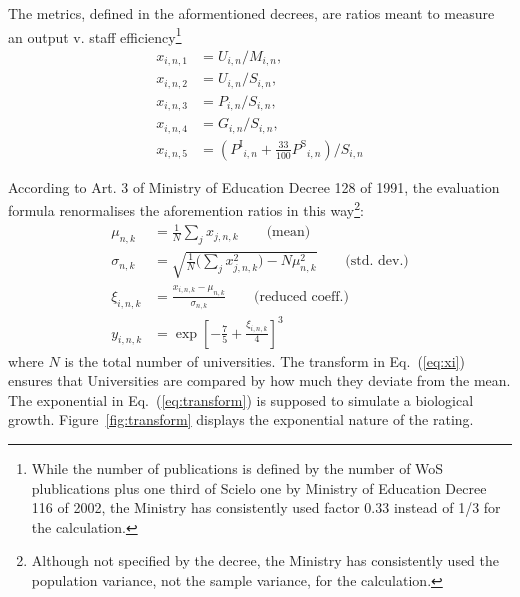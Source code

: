\documentclass[twocolumn]{article}
\def\npup{\ensuremath{U}}
\def\nmaj{\ensuremath{M}}
\def\nprof{\ensuremath{S}}
\def\ngrad{\ensuremath{P}}
\def\ngrant{\ensuremath{G}}
\def\nisi{\ensuremath{P^\text{I}}}
\def\nscielo{\ensuremath{P^\text{S}}}
\def\eqref#1{Eq.~(\ref{eq:#1})}
\begin{document}
The metrics, defined in the aformentioned decrees, are ratios meant to measure an output v. staff efficiency\footnote{While the number of publications is defined by the number of WoS plublications plus one third of Scielo one by Ministry of Education Decree 116 of 2002, the Ministry has consistently used factor 0.33 instead of 1/3 for the calculation.}
\begin{subequations}
\begin{align}
    x_{i,n,1} &= \npup_{i,n} / \nmaj_{i,n},  \label{eq:x1}                          \\
    x_{i,n,2} &= \npup_{i,n} / \nprof_{i,n},                           \\ 
    x_{i,n,3} &= \ngrad_{i,n} / \nprof_{i,n},                          \\
    x_{i,n,4} &= \ngrant_{i,n} / \nprof_{i,n},                         \\
    x_{i,n,5} &= (\nisi_{i,n} + \frac{33}{100} \nscielo_{i,n}) / \nprof_{i,n}
\end{align}
\end{subequations}

According to Art. 3 of Ministry of Education Decree 128 of 1991,  the
evaluation formula renormalises the aforemention ratios in this
way\footnote{Although not specified by the decree, the Ministry has
consistently used the population variance, not the sample variance, for the calculation.}:
\begin{subequations}
\begin{align}
    \mu_{n,k}    &= \frac1N\sum_j x_{j,n,k}\qquad\text{(mean)} \label{eq:mu}\\
    \sigma_{n,k} &= \sqrt{\frac 1N \Big(\sum_j x_{j,n,k}^2\Big) - N\mu_{n,k}^2}\qquad\text{(std. dev.)} \label{eq:sigma}\\
    \xi_{i,n,k}  &= \frac{x_{i,n,k} - \mu_{n,k} }{\sigma_{n,k}} 
\qquad\text{(reduced coeff.)} \label{eq:xi}\\
    y_{i,n,k}    &= \exp \left[ -\frac 75 + \frac{\xi_{i,n,k}}4  \right]^3 \label{eq:transform}
\end{align}
\end{subequations}
where $N$ is the total number of universities.
The transform in \eqref{xi} ensures that Universities are compared by how much they deviate from the mean. The exponential in \eqref{transform} is supposed to simulate a biological growth. Figure~\ref{fig:transform} displays the exponential nature of the rating.
\end{document}

